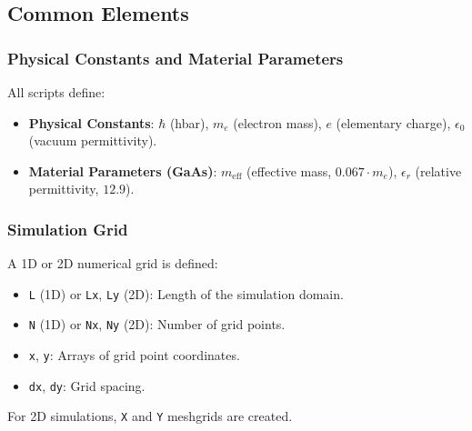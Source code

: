 \documentclass{article}
\begin{document}
\subsection{Common Elements}
\subsubsection{Physical Constants and Material Parameters}
All scripts define:
\begin{itemize}
    \item \textbf{Physical Constants}: $\hbar$ (hbar), $m_e$ (electron mass), $e$ (elementary charge), $\epsilon_0$ (vacuum permittivity).
    \item \textbf{Material Parameters (GaAs)}: $m_{\text{eff}}$ (effective mass, $0.067 \cdot m_e$), $\epsilon_r$ (relative permittivity, $12.9$).
\end{itemize}

\subsubsection{Simulation Grid}
A 1D or 2D numerical grid is defined:
\begin{itemize}
    \item \texttt{L} (1D) or \texttt{Lx}, \texttt{Ly} (2D): Length of the simulation domain.
    \item \texttt{N} (1D) or \texttt{Nx}, \texttt{Ny} (2D): Number of grid points.
    \item \texttt{x}, \texttt{y}: Arrays of grid point coordinates.
    \item \texttt{dx}, \texttt{dy}: Grid spacing.
\end{itemize}
For 2D simulations, \texttt{X} and \texttt{Y} meshgrids are created.
\end{document}
